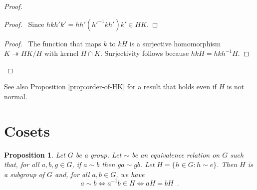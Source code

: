 \documentclass{book}
\let\qed\relax
\newtheorem{prop}{Proposition}[chapter]
\theoremstyle{definition}
\newcommand{\inv}[1]{\ensuremath{{#1}^{-1}}}
\begin{document}
\begin{proof}
\pf
{}
\begin{proof}
	\pf\ Since $hkh'k' = hh'(\inv{h'}kh')k' \in HK$.
\end{proof}
\begin{proof}
\pf\ The function that maps $k$ to $kH$ is a surjective homomorphism $K \twoheadrightarrow HK/H$ with kernel $H \cap K$. Surjectivity follows because $hkH = hk\inv{h}H$.
\end{proof}
\qed
\end{proof}

See also Proposition \ref{prop:order-of-HK} for a result that holds even if $H$ is not normal.

\section{Cosets}

\begin{prop}
\label{prop:sim-gives-H}
Let $G$ be a group. Let $\sim$ be an equivalence relation on $G$ such that, for all $a,b,g \in G$, if $a \sim b$ then $ga \sim gb$. Let $H = \{ h \in G : h \sim e \}$. Then $H$ is a subgroup of $G$ and, for all $a,b \in G$, we have
\[ a \sim b \Leftrightarrow \inv{a} b \in H \Leftrightarrow aH = bH \enspace . \]
\end{prop}
\end{document}
